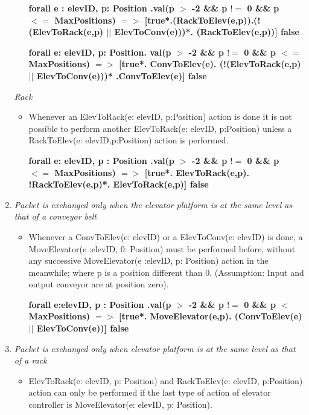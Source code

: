 \begin{enumerate}
\begin{itemize}
	\textbf{forall e : elevID, p: Position .val(p $>$ -2 \&\& p $!=$ 0 \&\& p $<=$ MaxPositions) $=>$ [true*.(RackToElev(e,p)).(!(ElevToRack(e,p) $||$ ElevToConv(e)))*. (RackToElev(e,p))] false }
	
	\textbf{forall e: elevID, p: Position. val(p $>$ -2 \&\& p $!=$ 0  \&\& p $<=$ MaxPositions) $=>$ [true*. ConvToElev(e). (!(ElevToRack(e,p) $||$ ElevToConv(e)))* .ConvToElev(e)] false	}
	\end{itemize}

	\textit{Rack}
	\begin{itemize}
	\item Whenever an ElevToRack(e: elevID, p:Position) action is done it is not possible to perform another ElevToRack(e: elevID, p:Position) unless a RackToElev(e: elevID,p:Position) action is performed.
	
	\textbf{forall e: elevID, p : Position .val(p $>$ -2 \&\& p $!=$ 0 \&\& p $<=$ MaxPositions) $=>$ [true*. ElevToRack(e,p). !RackToElev(e,p)*. ElevToRack(e,p)] false }
	\end{itemize}

\item \textit{ Packet is exchanged only when the elevator platform is at
the same level as that of a conveyor belt}
	\begin{itemize}
	\item Whenever a ConvToElev(e: elevID) or a ElevToConv(e: elevID) is done, a MoveElevator(e :elevID, 0: Position) must be performed before, without any successive MoveElevator(e :elevID, p: Position) action in the meanwhile; where p is a position different than 0. (Assumption: Input and output conveyor are at position zero).
	
	\textbf{forall e:elevID, p : Position .val(p $>$ -2 \&\& p $!=$ 0 \&\& p $<$ MaxPositions) $=>$ [true*. MoveElevator(e,p). (ConvToElev(e) $||$ ElevToConv(e))] false}
	
	\end{itemize}

\item \textit{Packet is exchanged only when elevator platform is at the same level as that of a rack}
	\begin{itemize}
	\item ElevToRack(e: elevID, p: Position) and RackToElev(e: elevID, p:Position) action can only be performed if the last type of action of elevator controller is MoveElevator(e: elevID, p: Position).
	\end{itemize}
	

\end{enumerate}
